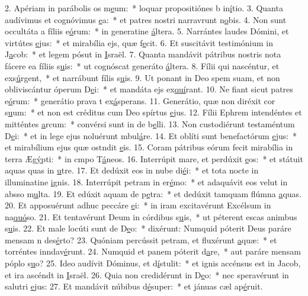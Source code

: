 2. Apériam in parábolis os m\uline{e}um:~* loquar propositiónes b in\uline{í}tio.
3. Quanta audívimus et cognóvimus \uline{e}a:~* et patres nostri narravrunt n\uline{o}bis.
4. Non sunt occultáta a fíliis e\uline{ó}rum:~* in generatine \uline{á}ltera.
5. Narrántes laudes Dómini, et virtútes \uline{e}jus:~* et mirabília ejs, quæ f\uline{e}cit.
6. Et suscitávit testimónium in J\uline{a}cob:~* et legem pósut in \uline{I}sraël.
7. Quanta mandávit pátribus nostris nota fácere ea fíliis s\uline{u}is:~* ut cognóscat generáto \uline{á}ltera.
8. Fílii qui nascéntur, et exs\uline{ú}rgent,~* et narrábunt fílis s\uline{u}is.
9. Ut ponant in Deo spem suam, et non obliviscántur óperum D\uline{e}i:~* et mandáta ejs ex\uline{quí}rant.
10. Ne fiant sicut patres e\uline{ó}rum:~* generátio prava t ex\uline{á}sperans.
11. Generátio, quæ non diréxit cor s\uline{u}um:~* et non est créditus cum Deo spírtus \uline{e}jus.
12. Fílii Ephrem intendéntes et mitténtes \uline{a}rcum:~* convérsi sunt in de b\uline{e}lli.
13. Non custodiérunt testaméntum D\uline{e}i:~* et in lege ejus noluérunt mbul\uline{á}re.
14. Et oblíti sunt benefactórum \uline{e}jus:~* et mirabílium ejus quæ ostndit \uline{e}is.
15. Coram pátribus eórum fecit mirabília in terra Æg\uline{ý}pti:~* in cmpo T\uline{á}neos.
16. Interrúpit mare, et perdúxit \uline{e}os:~* et státuit aquas quas in \uline{u}tre.
17. Et dedúxit eos in nube di\uline{é}i:~* et tota nocte in illuminatine \uline{i}gnis.
18. Interrúpit petram in er\uline{é}mo:~* et adaquávit eos velut in absso m\uline{u}lta.
19. Et edúxit aquam de p\uline{e}tra:~* et dedúxit tamquam flúmna \uline{a}quas.
20. Et apposuérunt adhuc peccáre \uline{e}i:~* in iram excitavérunt Excélsum in na\uline{quó}so.
21. Et tentavérunt Deum in córdibus s\uline{u}is,~* ut péterent escas animbus s\uline{u}is.
22. Et male locúti sunt de D\uline{e}o:~* dixérunt: Numquid póterit Deus paráre mensam n des\uline{é}rto?
23. Quóniam percússit petram, et fluxérunt \uline{a}quæ:~* et torréntes inndav\uline{é}runt.
24. Numquid et panem póterit d\uline{a}re,~* aut paráre mensam póplo s\uline{u}o?
25. Ideo audívit Dóminus, et d\uline{í}stulit:~* et ignis accénsus est in Jacob, et ira ascéndt in \uline{I}sraël.
26. Quia non credidérunt in D\uline{e}o:~* nec speravérunt in salutri \uline{e}jus:
27. Et mandávit núbibus d\uline{é}super:~* et jánuas cæl ap\uline{é}ruit.
